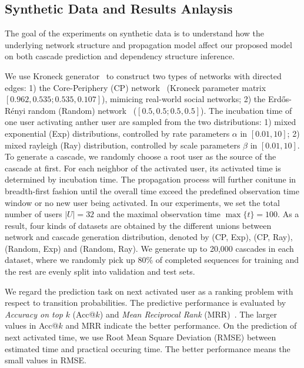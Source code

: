 \subsection{Synthetic Data and Results Anlaysis}
The goal of the experiments on synthetic
data is to understand how the underlying network structure and propagation
model affect our proposed model on both cascade prediction and
dependency structure inference. 

We use Kroneck
generator~\cite{LeskovecICML07} to construct two types of networks with directed
edges: 1) the Core-Periphery (CP) network~\cite{LeskovecWWW08} (Kroneck
parameter matrix $[0.962, 0.535; 0.535, 0.107]$), mimicing real-world social networks; 2) the
Erd\H{o}s-R{\'e}nyi random (Random) network~\cite{Erdos60} ($[0.5, 0.5; 0.5, 0.5]$). The incubation time
of one user activating anther user are sampled from the two distributions: 1)
mixed exponential (Exp) distributions, controlled by rate parameters $\alpha$
in $[0.01, 10]$; 2) mixed rayleigh (Ray) distribution, controlled
by scale parameters $\beta$ in $[0.01, 10]$. To generate a
cascade, we randomly choose a root user as the source of the cascade at first.
For each neighbor of the activated user, its activated time is determined by
incubation time. The propagation process will further conitune  in
breadth-first fashion until the overall time exceed the predefined observation
time window or no new user being activated. In our experiments, we set the total
number of users $|U|=32$ and the maximal observation time $\max\{t\}=100$.
As a result, four kinds of datasets are obtained by the different unions between
network and cascade generation distribution, denoted by (CP, Exp), (CP, Ray),
(Random, Exp) and (Random, Ray). We generate up to
20,000 cascades in each dataset, where we randomly pick up 80\% of completed sequences for training and the rest are
 evenly split into validation and test sets. 

We regard the prediction task on next activated user as a ranking problem
with respect to transition probabilities. The predictive performance is
evaluated by \textit{Accuracy on top} $k$ (Acc@$k$) and \textit{Mean Reciprocal Rank}
(MRR)~\cite{voorhees1999trec}.
The larger values in Acc@$k$ and MRR indicate the better performance.
On the prediction of next activated time, we use Root Mean Square Deviation
(RMSE) between estimated time and practical occuring time. The better
performance means the small values in RMSE.   

